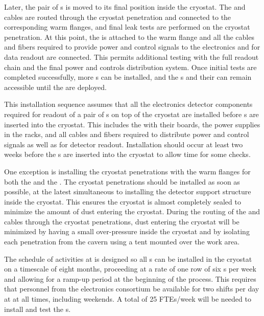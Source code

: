 Later, the pair of s is moved to its final position 
inside the cryostat. The 
and  cables are routed through the cryostat penetration and
connected to the corresponding warm flanges, and final leak tests are performed
on the cryostat penetration. At this point, the  is attached
to the warm flange and all the cables and fibers required to provide 
power and control signals to the  electronics and for data
readout are connected. This permits additional testing with the full 
 readout chain and the final power and controls distribution
system. Once initial tests are completed successfully, more s
can be installed, and the s and their  
can remain accessible until the  are deployed.

This installation sequence assumes that all the  electronics detector 
components required for readout of a pair of s  on top of the cryostat 
are installed before s are inserted into the cryostat. This 
includes the  with their boards, the power supplies in 
the racks, and all cables and fibers required to distribute power and
control signals as well as for detector readout. Installation should occur at least two weeks before
the s are inserted into the cryostat to allow time for some checks. 

One exception
is installing the cryostat penetrations with the warm flanges
for both the  and the . The cryostat
penetrations should be installed as soon as possible, at the latest
simultaneous to installing the detector support structure
inside the cryostat. This ensures the cryostat is almost 
completely sealed to minimize the amount of dust 
entering the cryostat. During the routing of the  and
 cables through the cryostat penetrations, dust entering the cryostat will be minimized by having a small
over-pressure inside the cryostat and by isolating each penetration
from the cavern using a tent mounted over 
the work area.

The schedule of activities at  is designed so all 
s can be installed in the cryostat on a timescale of eight
months, proceeding at a rate of one row of six s per week and
allowing for a ramp-up period at the beginning of the process. This
requires that personnel from the  electronics consortium be available
for two shifts per day at  at all times, including weekends. A
total of 25 FTEs/week will be needed to install and test the s. 

